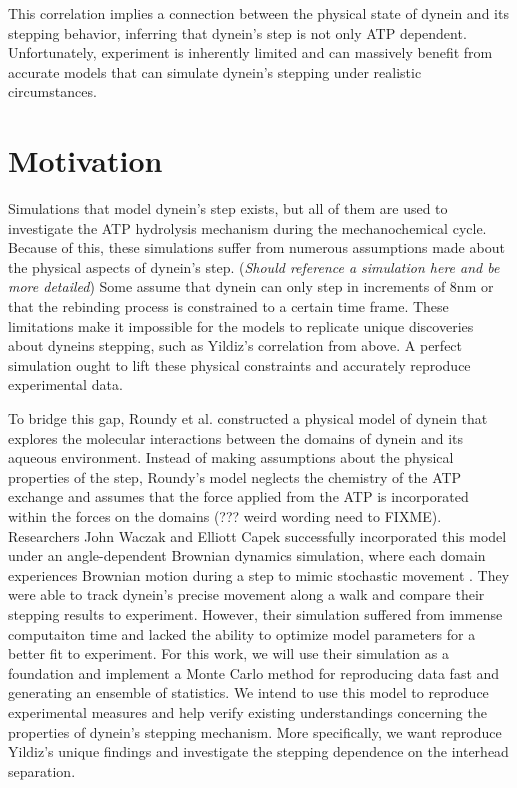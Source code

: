 This correlation implies a connection between the physical state of dynein and its stepping behavior, inferring that dynein's step is not only ATP dependent. Unfortunately, experiment is inherently limited and can massively benefit from accurate models that can simulate dynein's stepping under realistic circumstances.


\section{Motivation}

Simulations that model dynein's step exists, but all of them are used to investigate the ATP hydrolysis mechanism during the mechanochemical cycle. Because of this, these simulations suffer from numerous assumptions made about the physical aspects of dynein's step. (\textit{Should reference a simulation here and be more detailed}) Some assume that dynein can only step in increments of 8nm or that the rebinding process is constrained to a certain time frame. These limitations make it impossible for the models to replicate unique discoveries about dyneins stepping, such as Yildiz's correlation from above. A perfect simulation ought to lift these physical constraints and accurately reproduce experimental data.

To bridge this gap, Roundy et al. constructed a physical model of dynein that explores the molecular interactions between the domains of dynein and its aqueous environment. Instead of making assumptions about the physical properties of the step, Roundy's model neglects the chemistry of the ATP exchange and assumes that the force applied from the ATP is incorporated within the forces on the domains (??? weird wording need to FIXME). Researchers John Waczak and Elliott Capek successfully incorporated this model under an angle-dependent Brownian dynamics simulation, where each domain experiences Brownian motion during a step to mimic stochastic movement \cite{Capek2017, Burgess2003}. They were able to track dynein's precise movement along a walk and compare their stepping results to experiment. However, their simulation suffered from immense computaiton time and lacked the ability to optimize model parameters for a better fit to experiment. For this work, we will use their simulation as a foundation and implement a Monte Carlo method for reproducing data fast and generating an ensemble of statistics. We intend to use this model to reproduce experimental measures and help verify existing understandings concerning the properties of dynein’s stepping mechanism. More specifically, we want reproduce Yildiz's unique findings and investigate the stepping dependence on the interhead separation. 



